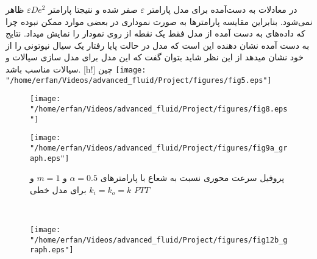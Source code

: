 \newpage
{}
در معادلات به دست‌آمده برای مدل
پارامتر 
$\varepsilon$
 صفر شده و نتیجتا پارامتر 
 $\varepsilon De^2$
ظاهر نمی‌شود. بنابراین مقایسه پارامتر‌ها به صورت نموداری در بعضی موارد ممکن نبوده چرا که داده‌های به دست آمده از مدل 
فقط یک نقطه از روی نمودار را نمایش میداد.
نتایج به دست آمده نشان دهنده این است که مدل
در حالت پایا رفتار یک سیال نیوتونی را از خود نشان میدهد از این نظر شاید بتوان گفت که این مدل برای مدل سازی سیالات 
و سیالات
مناسب باشد.
[h!]
‌چین
\texttt{[image: "/home/erfan/Videos/advanced\_fluid/Project/figures/fig5.eps"]}
\begin{figure}[h!]
	\centering
	\begin{minipage}{0.45\textwidth}
		\texttt{[image: "/home/erfan/Videos/advanced\_fluid/Project/figures/fig8.eps"]}
		\caption{\small
			پروفیل سرعت محوری نسبت به شعاع با پارامتر‌های $\alpha = 0.5$ و $m=1$ و $ k_i=k_o=k$ برای مدل خطی $PTT$}
	\end{minipage}\hfill
	\begin{minipage}{0.45\textwidth}
		\texttt{[image: "/home/erfan/Videos/advanced\_fluid/Project/figures/fig9a\_graph.eps"]}
	\end{minipage}
\end{figure}
\\
\begin{figure}[ht!]
	\centering
	\texttt{[image: "/home/erfan/Videos/advanced\_fluid/Project/figures/fig12b\_graph.eps"]}
\end{figure}
\begin{figure}

\end{figure}
